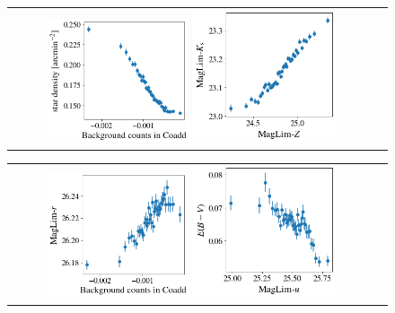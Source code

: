\documentclass{aa}
\numberwithin{equation}{section}
\begin{document}
\begin{figure}
\centering
\begin{tabular}{cc}
\includegraphics[width=0.4\textwidth, height =0.4\textwidth]{figures_tmp/sys_nstar_backgr.png}
\includegraphics[width=0.4\textwidth, height =0.4\textwidth]{figures_tmp/sys_maglimk_maglimz.png}
\end{tabular}
\begin{tabular}{cc}
\includegraphics[width=0.4\textwidth, height =0.4\textwidth]{figures_tmp/sys_maglimr_backgr.png}
\includegraphics[width=0.4\textwidth, height =0.4\textwidth]{figures_tmp/sys_ext_maglimu.png}

\end{tabular}
\end{figure}
\end{document}
